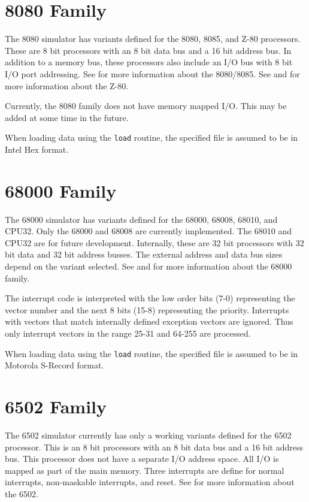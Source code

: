 \documentclass[10pt, openany]{book}
\newcommand{\function}[1]{\texttt{#1}}
\begin{document}
\section{8080 Family}
The 8080 simulator has variants defined for the 8080, 8085, and Z-80 processors.  These are 8 bit processors with an 8 bit data bus and a 16 bit address bus.  In addition to a memory bus, these processors also include an I/O bus with 8 bit I/O port addressing.  See \cite{i8080} for more information about the 8080/8085.  See \cite{z80} and \cite{z80undoc} for more information about the Z-80.

Currently, the 8080 family does not have memory mapped I/O.  This may be added at some time in the future.

When loading data using the \function{load} routine, the specified file is assumed to be in Intel Hex format.

\section{68000 Family}
The 68000 simulator has variants defined for the 68000, 68008, 68010, and CPU32.  Only the 68000 and 68008 are currently implemented.  The 68010 and CPU32 are for future development.  Internally, these are 32 bit processors with 32 bit data and 32 bit address busses.  The external address and data bus sizes depend on the variant selected.  See \cite{m68000a} and \cite{m68000b} for more information about the 68000 family.

The interrupt code is interpreted with the low order bits (7-0) representing the vector number and the next 8 bits (15-8) representing the priority.  Interrupts with vectors that match internally defined exception vectors are ignored.  Thus only interrupt vectors in the range 25-31 and 64-255 are processed.

When loading data using the \function{load} routine, the specified file is assumed to be in Motorola S-Record format.

\section{6502 Family}
The 6502 simulator currently has only a working variants defined for the 6502 processor.  This is an 8 bit processors with an 8 bit data bus and a 16 bit address bus.  This processor does not have a separate I/O address space.  All I/O is mapped as part of the main memory.  Three interrupts are define for normal interrupts, non-maskable interrupts, and reset.  See \cite{msc6502} for more information about the 6502.
\end{document}
